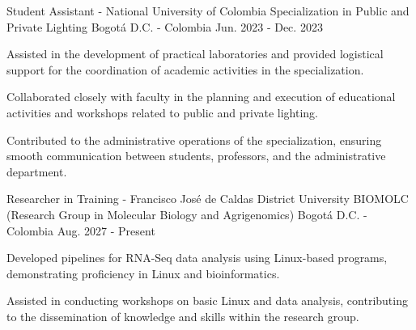 \begin{cventries}
\cventry
{Student Assistant - National University of Colombia} %
{Specialization in Public and Private Lighting} %
{Bogotá D.C. - Colombia} %
{Jun. 2023 - Dec. 2023} %
{ %
\begin{cvitems}
\item {Assisted in the development of practical laboratories and provided logistical support for the coordination of academic activities in the specialization.}
\item {Collaborated closely with faculty in the planning and execution of educational activities and workshops related to public and private lighting.}
\item {Contributed to the administrative operations of the specialization, ensuring smooth communication between students, professors, and the administrative department.}
\end{cvitems}
}

\cventry
{Researcher in Training - Francisco José de Caldas District University} %
{BIOMOLC (Research Group in Molecular Biology and Agrigenomics)} %
{Bogotá D.C. - Colombia} %
{Aug. 2027 - Present} %
{ %
\begin{cvitems}
\item {Developed pipelines for RNA-Seq data analysis using Linux-based programs, demonstrating proficiency in Linux and bioinformatics.}
\item {Assisted in conducting workshops on basic Linux and data analysis, contributing to the dissemination of knowledge and skills within the research group.}
\end{cvitems}
}
\end{cventries}
